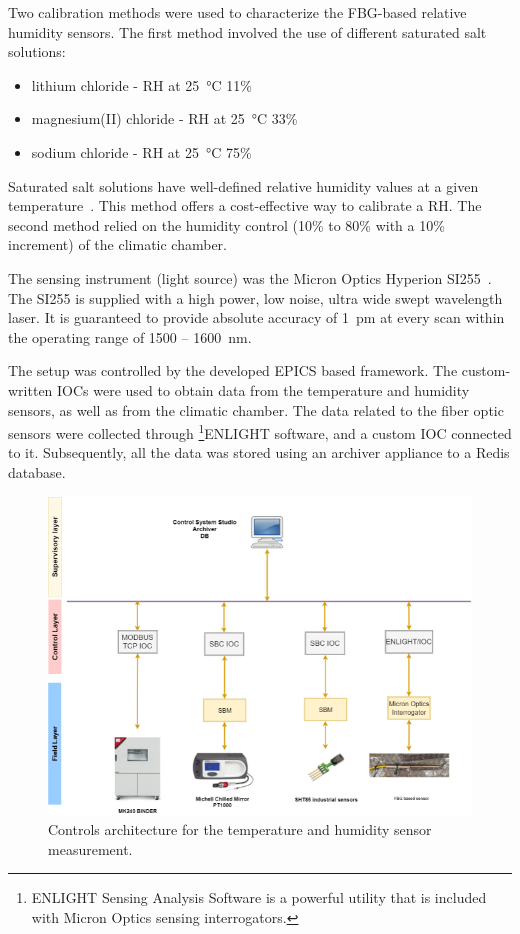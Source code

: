 Two calibration methods were used to characterize the \gls{FBG}-based relative humidity sensors. The first method involved the use of different saturated salt solutions:
\begin{itemize}
    \item lithium chloride - \gls{RH} at \SI{25}{\celsius} 11\%
    \item magnesium(II) chloride - \gls{RH} at \SI{25}{\celsius} 33\%
    \item sodium chloride - \gls{RH} at \SI{25}{\celsius} 75\%
\end{itemize}
 Saturated salt solutions have well-defined relative humidity values at a given temperature~\cite{Fossa:687857}. This method offers a cost-effective way to calibrate a \gls{RH}. The second method relied on the humidity control (10\% to 80\% with a 10\% increment) of the climatic chamber.
 
 The sensing instrument (light source) was the Micron Optics Hyperion SI255~\cite{si255}. The SI255 is supplied with a high power, low noise, ultra wide swept wavelength laser. It is guaranteed to provide absolute accuracy of 1~pm at every scan within the operating range of 1500 -- 1600~nm. 

The setup was controlled by the developed \gls{EPICS} based framework. The custom-written \glspl{IOC} were used to obtain data from the temperature and humidity sensors, as well as from the climatic chamber. The data related to the fiber optic sensors were collected through \footnote{ENLIGHT Sensing Analysis Software is a powerful utility that is included with Micron
Optics sensing interrogators.}{ENLIGHT} software, and a custom \gls{IOC} connected to it. Subsequently, all the data was stored using an archiver appliance to a Redis database. 

\begin{figure}[!h]
\centering
\includegraphics[width=0.85\columnwidth]{Chapter5/images/FOS_dcs_scheme.png}
\caption{Controls architecture for the temperature and humidity sensor measurement.}
\label{fig:fos_arch}
\end{figure}
\newpage
